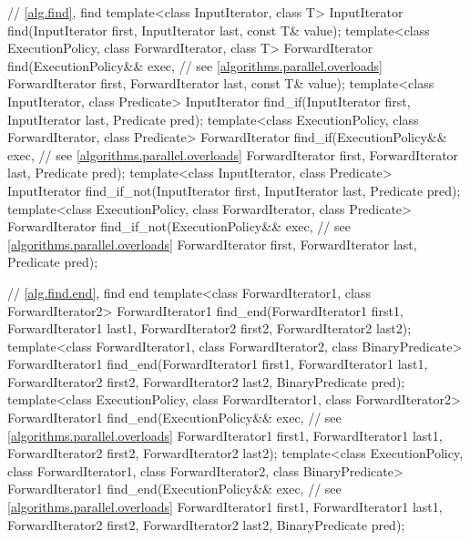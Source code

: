 \begin{codeblock}
{  // \ref{alg.find}, find
  template<class InputIterator, class T>
    InputIterator find(InputIterator first, InputIterator last,
                       const T& value);
  template<class ExecutionPolicy, class ForwardIterator, class T>
    ForwardIterator find(ExecutionPolicy&& exec, // see \ref{algorithms.parallel.overloads}
                         ForwardIterator first, ForwardIterator last,
                         const T& value);
  template<class InputIterator, class Predicate>
    InputIterator find_if(InputIterator first, InputIterator last,
                          Predicate pred);
  template<class ExecutionPolicy, class ForwardIterator, class Predicate>
    ForwardIterator find_if(ExecutionPolicy&& exec, // see \ref{algorithms.parallel.overloads}
                            ForwardIterator first, ForwardIterator last,
                            Predicate pred);
  template<class InputIterator, class Predicate>
    InputIterator find_if_not(InputIterator first, InputIterator last,
                              Predicate pred);
  template<class ExecutionPolicy, class ForwardIterator, class Predicate>
    ForwardIterator find_if_not(ExecutionPolicy&& exec, // see \ref{algorithms.parallel.overloads}
                                ForwardIterator first, ForwardIterator last,
                                Predicate pred);

  // \ref{alg.find.end}, find end
  template<class ForwardIterator1, class ForwardIterator2>
    ForwardIterator1
      find_end(ForwardIterator1 first1, ForwardIterator1 last1,
               ForwardIterator2 first2, ForwardIterator2 last2);
  template<class ForwardIterator1, class ForwardIterator2, class BinaryPredicate>
    ForwardIterator1
      find_end(ForwardIterator1 first1, ForwardIterator1 last1,
               ForwardIterator2 first2, ForwardIterator2 last2,
               BinaryPredicate pred);
  template<class ExecutionPolicy, class ForwardIterator1, class ForwardIterator2>
    ForwardIterator1
      find_end(ExecutionPolicy&& exec, // see \ref{algorithms.parallel.overloads}
               ForwardIterator1 first1, ForwardIterator1 last1,
               ForwardIterator2 first2, ForwardIterator2 last2);
  template<class ExecutionPolicy, class ForwardIterator1,
           class ForwardIterator2, class BinaryPredicate>
    ForwardIterator1
      find_end(ExecutionPolicy&& exec, // see \ref{algorithms.parallel.overloads}
               ForwardIterator1 first1, ForwardIterator1 last1,
               ForwardIterator2 first2, ForwardIterator2 last2,
               BinaryPredicate pred);

}
\end{codeblock}
